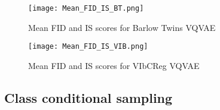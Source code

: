 \documentclass[../../thesis.tex]{subfiles}
\begin{document}
\begin{figure}[H]
    \label{fig:Mean_FID_IS_BT}
    \texttt{[image: Mean\_FID\_IS\_BT.png]}
    \centering  
    \caption{Mean FID and IS scores for Barlow Twins VQVAE}
\end{figure}

\begin{figure}[H]
    \label{fig:Mean_FID_IS_VIB}
    \texttt{[image: Mean\_FID\_IS\_VIB.png]}
    \centering  
    \caption{Mean FID and IS scores for VIbCReg VQVAE}
\end{figure}

\subsection{Class conditional sampling}
\end{document}
